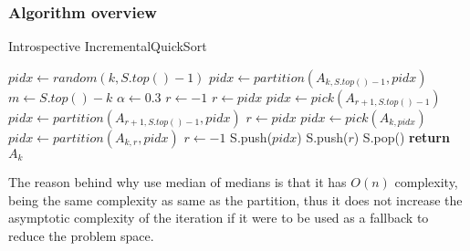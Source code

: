 \subsubsection{Algorithm overview}
\begin{algorithm}
  \begin{algorithmic}[1]
    \caption{Introspective IncrementalQuickSort}\label{ALG:IIQS}
    \State $pidx \gets random(k,S.top()-1)$
    \State $pidx \gets partition(A_{k,S.top()-1}, pidx)$
    \State $m \gets S.top() - k$
    \State $\alpha \gets 0.3$
    \State $r \gets -1$
    \State $r \gets pidx$
    \State $pidx \gets pick(A_{r+1,S.top()-1})$
    \State $pidx \gets partition(A_{r+1,S.top()-1},pidx)$
    \State $r \gets pidx$
    \State $pidx \gets pick(A_{k,pidx})$
    \State $pidx \gets partition(A_{k,r}, pidx)$
    \State $r \gets -1$
    \EndIf
    \State S.push($pidx$)
    \State S.push($r$)
    \EndIf
    \EndWhile
    \State S.pop()
    \State \textbf{return} $A_{k}$\label{IIQS_main_cycle}
    \EndProcedure
  \end{algorithmic}
\end{algorithm}

The reason behind why use median of medians is that it has $O(n)$ complexity, being the same complexity as same as the partition, thus it does not increase the asymptotic complexity of the iteration if it were to be used as a fallback to reduce the problem space.
